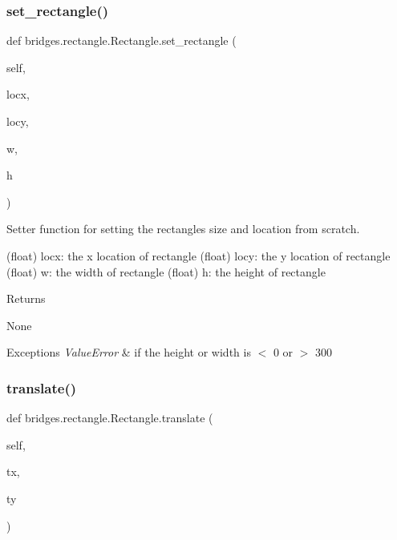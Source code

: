 \subsubsection{\texorpdfstring{set\+\_\+rectangle()}{set\_rectangle()}}
{\footnotesize\ttfamily def bridges.\+rectangle.\+Rectangle.\+set\+\_\+rectangle (\begin{DoxyParamCaption}\item[{}]{self,  }\item[{}]{locx,  }\item[{}]{locy,  }\item[{}]{w,  }\item[{}]{h }\end{DoxyParamCaption})}



Setter function for setting the rectangles size and location from scratch. 

(float) locx\+: the x location of rectangle (float) locy\+: the y location of rectangle (float) w\+: the width of rectangle (float) h\+: the height of rectangle \begin{DoxyReturn}{Returns}


None
\end{DoxyReturn}

\begin{DoxyExceptions}{Exceptions}
{\em Value\+Error} & if the height or width is $<$ 0 or $>$ 300 \\
\hline
\end{DoxyExceptions}
\mbox{\label{classbridges_1_1rectangle_1_1_rectangle_aa032816d119516e90a4237cd979a5d41}} 
\subsubsection{\texorpdfstring{translate()}{translate()}}
{\footnotesize\ttfamily def bridges.\+rectangle.\+Rectangle.\+translate (\begin{DoxyParamCaption}\item[{}]{self,  }\item[{}]{tx,  }\item[{}]{ty }\end{DoxyParamCaption})}



